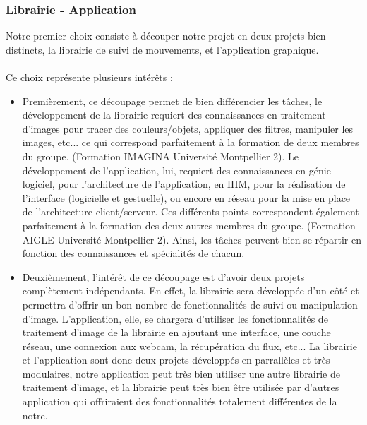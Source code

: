 \documentclass{article}
\begin{document}
			\subsubsection{Librairie - Application}
			Notre premier choix consiste à découper notre projet en deux projets bien distincts, la librairie de suivi de mouvements, et l'application graphique. \\ \\
			Ce choix représente plusieurs intérêts : \\
			\begin{itemize}
				\item{Premièrement, ce découpage permet de bien différencier les tâches, le développement de la librairie requiert des connaissances en traitement d'images pour tracer des couleurs/objets, appliquer des filtres, manipuler les images, etc... ce qui correspond parfaitement à la formation de deux membres du groupe. (Formation IMAGINA Université Montpellier 2). Le développement de l'application, lui, requiert des connaissances en génie logiciel, pour l'architecture de l'application, en IHM, pour la réalisation de l'interface (logicielle et gestuelle), ou encore en réseau pour la mise en place de l'architecture client/serveur. Ces différents points correspondent également parfaitement à la formation des deux autres membres du groupe. (Formation AIGLE Université Montpellier 2). Ainsi, les tâches peuvent bien se répartir en fonction des connaissances et spécialités de chacun.} \\
				\item{Deuxièmement, l'intérêt de ce découpage est d'avoir deux projets complètement indépendants. En effet, la librairie sera développée d'un côté et permettra d'offrir un bon nombre de fonctionnalités de suivi ou manipulation d'image. L'application, elle, se chargera d'utiliser les fonctionnalités de traitement d'image de la librairie en ajoutant une interface, une couche réseau, une connexion aux webcam, la récupération du flux, etc...
				La librairie et l'application sont donc deux projets développés en parrallèles et très modulaires, notre application peut très bien utiliser une autre librairie de traitement d'image, et la librairie peut très bien être utilisée par d'autres application qui offriraient des fonctionnalités totalement différentes de la notre.}
			\end{itemize}
\end{document}
